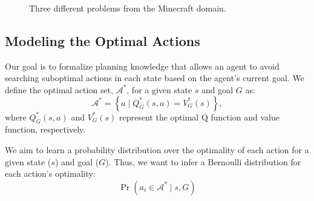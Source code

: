 \documentclass[11pt]{article}
\begin{document}
\begin{figure}[t]
\centering
{}
  \caption{Three different problems from the Minecraft domain.}
  \label{fig:minecraft}
\end{figure}


\subsection{Modeling the Optimal Actions}

Our goal is to formalize planning knowledge that allows an agent to
avoid searching suboptimal actions in each state based on the agent's
current goal. We define the optimal action set, $\mathcal{A}^*$, for a
given state $s$ and goal $G$ as:
\begin{equation}
\mathcal{A}^* = \left\{ a \mid Q^*_G(s,a) = V^*_G(s) \right\}, 
\label{eq:opt_act_set}
\end{equation}
where $Q^*_G(s,a)$ and $V^*_G(s)$ represent the optimal Q function and 
value function, respectively.

We aim to learn a probability distribution over the optimality of each action
for a given state ($s$) and goal ($G$). Thus, we want to infer a Bernoulli
distribution for each action's optimality:
\begin{equation}
\Pr(a_i \in \mathcal{A}^* \mid s, G)
\label{eq:master}
\end{equation}
\end{document}
